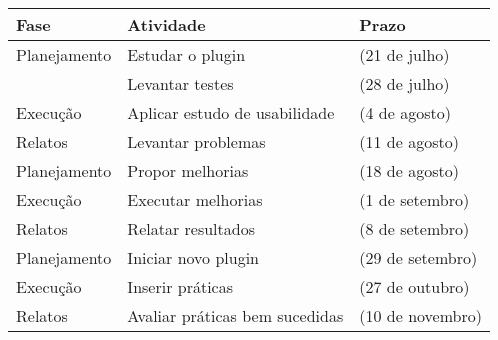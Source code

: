 \begin{table}[h]
\begin{tabular}{|l|l|l|}
\hline
\textbf{Fase}            & \textbf{Atividade}             & \textbf{Prazo} \\ \hline
Planejamento             & Estudar o plugin               & (21 de julho)          \\ \hline
                         & Levantar testes                & (28 de julho)          \\ \hline
Execução                 & Aplicar estudo de usabilidade  & (4 de agosto)          \\ \hline
Relatos                  & Levantar problemas             & (11 de agosto)          \\ \hline
Planejamento             & Propor melhorias               & (18 de agosto)          \\ \hline
Execução                 & Executar melhorias             & (1 de setembro)          \\ \hline
Relatos                  & Relatar resultados             & (8 de setembro)          \\ \hline
Planejamento             & Iniciar novo plugin            & (29 de setembro)          \\ \hline
Execução                 & Inserir práticas               & (27 de outubro)          \\ \hline
Relatos                  & Avaliar práticas bem sucedidas & (10 de novembro)          \\ \hline

\end{tabular}
\end{table}

